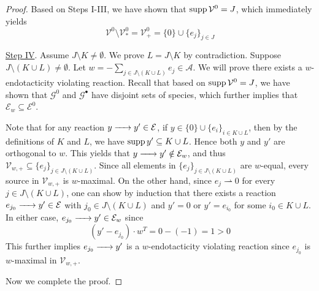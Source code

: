 \documentclass[10pt]{amsart}
\numberwithin{equation}{section}
\theoremstyle{plain}
\theoremstyle{definition}
\theoremstyle{remark}
\newcommand{\cA}{\mathcal{A}}
\newcommand{\cE}{\mathcal{E}}
\newcommand{\cG}{\mathcal{G}}
\newcommand{\cV}{\mathcal{V}}
\newcommand{\supp}{{\rm supp\,}}
\begin{document}
\begin{proof}
\medskip

Based on Steps I-III, we have shown that $\supp\cV^0= J$, which immediately yields \begin{equation}\label{eq:sources-of-G^0}
\cV^0\setminus\cV^0_*=\cV^0_+=\{0\}\cup\{e_j\}_{j\in J}\end{equation}
\medskip

\noindent \underline{Step IV}. Assume  $J\setminus K\neq\emptyset$. We prove $L=J\setminus K$ 
by contradiction. 
Suppose $J\setminus (K\cup L)\neq\emptyset$. 
Let $w=-\sum_{j\in J\setminus  (K\cup L)}e_{j}\in\cA$. We will prove there exists a $w$-endotacticity violating reaction. Recall that based on $\supp\cV^0= J$, we have shown that $\cG^0$ and $\cG^{\bullet}$ have disjoint sets of species, which further implies that $\cE_w\subseteq\cE^0$.

Note that for any reaction $y\ce{->}y'\in\cE$, if $y\in\{0\}\cup\{e_i\}_{i\in K\cup L}$, then by the definitions of $K$ and $L$, we have $\supp y'\subseteq K\cup L$. Hence both $y$ and $y'$ are orthogonal to $w$. This yields that $y\ce{->}y'\notin \cE_w$, and thus $\cV_{w,+}\subseteq\{e_j\}_{j\in J\setminus (K\cup L)}$. Since all elements in $\{e_j\}_{j\in J\setminus (K\cup L)}$ are $w$-equal, every source in $\cV_{w,+}$ is $w$-maximal. On the other hand, since $e_j\rightharpoonup0$ for every $j\in J\setminus (K\cup L)$, one can show by induction that there exists a reaction $e_{j_0}\ce{->}y'\in\cE$ with $j_0\in J\setminus (K\cup L)$ and $y'=0$ or $y'=e_{i_0}$ for some $i_0\in K\cup L$. In either case, $e_{j_0}\ce{->}y'\in\cE_w$ since $$(y'-e_{j_0})\cdot w^T=0-(-1)=1>0$$ This further implies  $e_{j_0}\ce{->}y'$ is a $w$-endotacticity violating reaction since $e_{j_0}$ is $w$-maximal in $\cV_{w,+}$.

\medskip

Now we complete the proof.
\end{proof}
\end{document}
